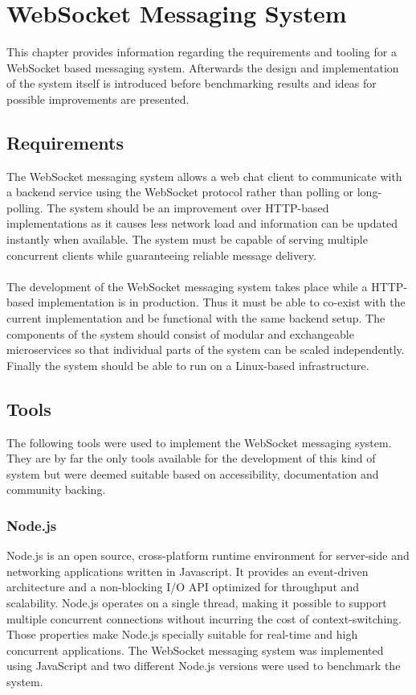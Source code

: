 \chapter{WebSocket Messaging System}
\label{chapter:websocketMessagingSystem}

This chapter provides information regarding the requirements and tooling for a WebSocket based messaging system. Afterwards the design and implementation of the system itself is introduced before benchmarking results and ideas for possible improvements are presented.

\section{Requirements}

The WebSocket messaging system allows a web chat client to communicate with a backend service using the WebSocket protocol rather than polling or long-polling. The system should be an improvement over HTTP-based implementations as it causes less network load and information can be updated instantly when available. The system must be capable of serving multiple concurrent clients while guaranteeing reliable message delivery.
\\ \\
The development of the WebSocket messaging system takes place while a HTTP-based implementation is in production. Thus it must be able to co-exist with the current implementation and be functional with the same backend setup. The components of the system should consist of modular and exchangeable microservices so that individual parts of the system can be scaled independently. Finally the system should be able to run on a Linux-based infrastructure.

\section{Tools}

The following tools were used to implement the WebSocket messaging system. They are by far the only tools available for the development of this kind of system but were deemed suitable based on accessibility, documentation and community backing.

\subsection{Node.js}

Node.js is an open source, cross-platform runtime environment for server-side and networking applications written in Javascript. It provides an event-driven architecture and a non-blocking I/O API optimized for throughput and scalability. Node.js operates on a single thread, making it possible to support multiple concurrent connections without incurring the cost of context-switching. Those properties make Node.js specially suitable for real-time and high concurrent applications. The WebSocket messaging system was implemented using JavaScript and two different Node.js versions were used to benchmark the system.

